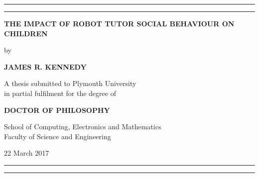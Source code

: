 {\centering
\rule{\textwidth}{1pt}\par %
\vspace{2pt}\vspace{-\baselineskip} %
\rule{\textwidth}{0.4pt}\par %

\vspace*{4\baselineskip}
\centering
\textbf{THE IMPACT OF ROBOT TUTOR SOCIAL BEHAVIOUR ON CHILDREN}
\vspace*{2\baselineskip}

by
\vspace*{2\baselineskip}

\textbf{JAMES R. KENNEDY}
\vspace*{6\baselineskip}

A thesis submitted to Plymouth University\\
in partial fulfilment for the degree of
\vspace*{2\baselineskip}

\textbf{DOCTOR OF PHILOSOPHY}
\vfill

School of Computing, Electronics and Mathematics\\
Faculty of Science and Engineering
\vspace*{2\baselineskip}

22 March 2017

\rule{\textwidth}{0.4pt}\par %
\vspace{2pt}\vspace{-\baselineskip} %
\rule{\textwidth}{1pt}\par} %